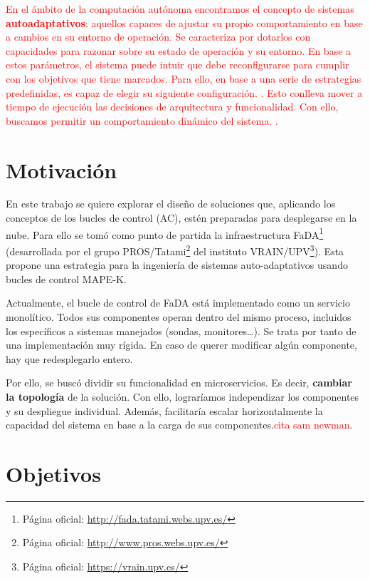 \textcolor{red}{En el ámbito de la computación autónoma encontramos el concepto de sistemas \textbf{autoadaptativos}: aquellos capaces de ajustar su propio comportamiento en base a cambios en su entorno de operación. Se caracteriza por dotarlos con capacidades para razonar sobre su estado de operación y su entorno. En base a estos parámetros, el sistema puede intuir que debe reconfigurarse para cumplir con los objetivos que tiene marcados. Para ello, en base a una serie de estrategias predefinidas, es capaz de elegir su siguiente configuración. \cite{garlanIncreasingSystemDependability2003}. Esto conlleva mover a tiempo de ejecución las decisiones de arquitectura y funcionalidad. Con ello, buscamos permitir un comportamiento dinámico del sistema. \cite{brunEngineeringSelfAdaptiveSystems2009}.}

\section{Motivación}

En este trabajo se quiere explorar el diseño de soluciones que, aplicando los conceptos de los bucles de control (AC), estén preparadas para desplegarse en la nube. Para ello se tomó como punto de partida la infraestructura FaDA\footnote{Página oficial: \url{http://fada.tatami.webs.upv.es/}} (desarrollada por el grupo PROS/Tatami\footnote{Página oficial: \url{http://www.pros.webs.upv.es/}} del instituto VRAIN/UPV\footnote{Página oficial: \url{https://vrain.upv.es/}}). Esta propone una estrategia para la ingeniería de sistemas auto-adaptativos usando bucles de control MAPE-K\cite{ibmcorporationArchitecturalBlueprintAutonomic2006, fonsServiciosAdaptivereadyPara2021}.

Actualmente, el bucle de control de FaDA está implementado como un servicio monolítico. Todos sus componentes operan dentro del mismo proceso, incluidos los específicos a sistemas manejados (sondas, monitores\dots). Se trata por tanto de una implementación muy rígida. En caso de querer modificar algún componente, hay que redesplegarlo entero.

Por ello, se buscó dividir su funcionalidad en microservicios. Es decir, \textbf{cambiar la topología} de la solución. Con ello, lograríamos independizar los componentes y su despliegue individual. Además, facilitaría escalar horizontalmente la capacidad del sistema en base a la carga de sus componentes.\textcolor{red}{cita sam newman}.

\section{Objetivos}

